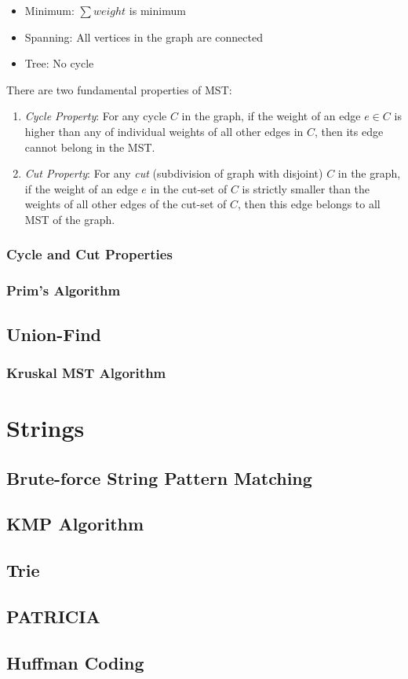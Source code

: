 \documentclass{report}
\begin{document}
\begin{itemize}
  \item Minimum: $\sum weight$ is minimum
  \item Spanning: All vertices in the graph are connected
  \item Tree: No cycle
\end{itemize}

There are two fundamental properties of MST:

\begin{enumerate}
  \item \textit{Cycle Property}: For any cycle $C$ in the graph, if the weight of an edge $e \in C$ is higher than any of individual weights of all other edges in $C$, then its edge cannot belong in the MST.
  \item \textit{Cut Property}: For any \textit{cut} (subdivision of graph with disjoint) $C$ in the graph, if the weight of an edge $e$ in the cut-set of $C$ is strictly smaller than the weights of all other edges of the cut-set of $C$, then this edge belongs to all MST of the graph.
\end{enumerate}

\subsection{Cycle and Cut Properties}

\subsection{Prim's Algorithm}

\section{Union-Find}

\subsection{Kruskal MST Algorithm}


\chapter{Strings}

\section{Brute-force String Pattern Matching}

\section{KMP Algorithm}

\section{Trie}

\section{PATRICIA}

\section{Huffman Coding}
\end{document}

